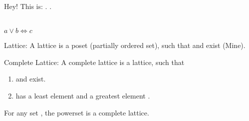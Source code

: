 \documentclass{article}
\begin{document}
Hey! This is: \absexpr{\lor}. \absexpr{\iff}.


\\
\(a \lor b \iff c\)

Lattice: A lattice  is a poset (partially ordered set), such that  and  exist (Mine).

Complete Lattice: A complete lattice  is a lattice, such that
\begin{enumerate}[nosep]
   \item {} and  exist.
   \item {} has a least element \absexpr{\bot} and a greatest element \absexpr{\top}.
\end{enumerate}

For any set , the powerset  is a complete lattice.
\end{document}
